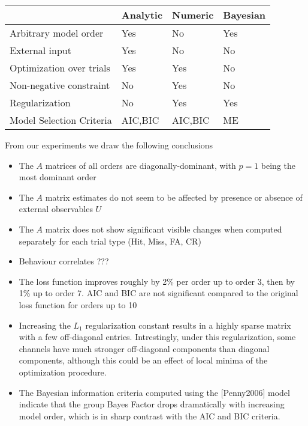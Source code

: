 \documentclass[a4paper,10pt]{article}
\begin{document}
\begin{table}[h!]
\centering
\begin{tabular}{l | l | l | l}
                            & Analytic & Numeric & Bayesian \\ \hline
  Arbitrary model order     & Yes & No & Yes \\ \hline
  External input            & Yes & No & No \\ \hline
  Optimization over trials  & Yes & Yes & No \\ \hline
  Non-negative constraint   & No  & Yes & No \\ \hline
  Regularization            & No  & Yes & Yes \\ \hline
  Model Selection Criteria  & AIC,BIC  & AIC,BIC & ME \\
\end{tabular}
\end{table}

From our experiments we draw the following conclusions
\begin{itemize}
 \item The $A$ matrices of all orders are diagonally-dominant, with $p=1$ being the most dominant order
 \item The $A$ matrix estimates do not seem to be affected by presence or absence of external observables $U$
 \item The $A$ matrix does not show significant visible changes when computed separately for each trial type (Hit, Miss, FA, CR)
 \item Behaviour correlates ???
 \item The loss function improves roughly by 2\% per order up to order 3, then by 1\% up to order 7. AIC and BIC are not significant compared to the original loss function for orders up to 10
 \item Increasing the $L_1$ regularization constant results in a highly sparse matrix with a few off-diagonal entries. Intrestingly, under this regularization, some channels have much stronger off-diagonal components than diagonal components, although this could be an effect of local minima of the optimization procedure.
 \item The Bayesian information criteria computed using the [Penny2006] model indicate that the group Bayes Factor drops dramatically with increasing model order, which is in sharp contrast with the AIC and BIC criteria. 

\end{itemize}
\end{document}
